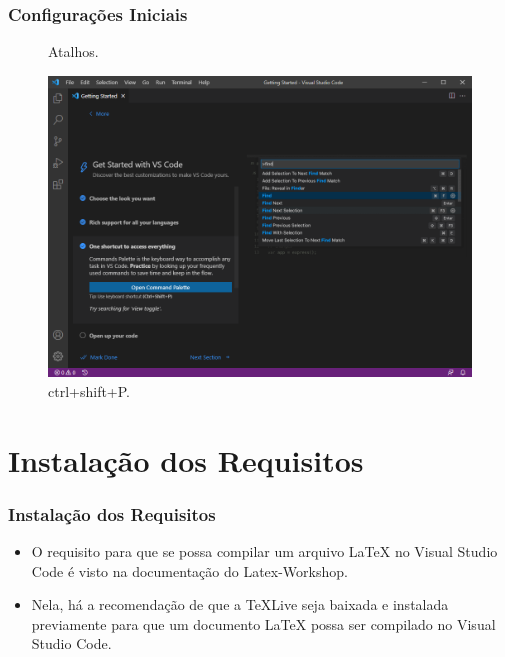 \documentclass{beamer}
\begin{document}
\begin{frame}
    \frametitle{Configurações Iniciais}
\begin{figure}[h]
    \centering
    \caption{Atalhos.}
    \label{fig:atalhos}
    \includegraphics[width=0.8\textheight]{../images/atalhos.png}
    \caption*{\footnotesize ctrl+shift+P.}
\end{figure}
\end{frame}

\section{Instalação dos Requisitos}

\begin{frame}
    \frametitle{Instalação dos Requisitos}
    \begin{itemize}
        \item O requisito para que se possa compilar um arquivo LaTeX no Visual Studio Code é visto na documentação do Latex-Workshop.
        \item Nela, há a recomendação de que a TeXLive seja baixada e instalada previamente para que um documento LaTeX possa ser compilado no Visual Studio Code.
    \end{itemize}
\end{frame}
\end{document}
